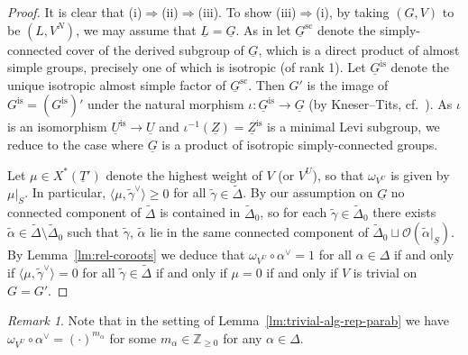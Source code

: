 \documentclass[a4paper]{amsart}
\numberwithin{equation}{section}
\theoremstyle{remark}
\newtheorem{remark}[thm]{Remark}
\theoremstyle{definition}
\newcommand{\Z}{\mathbb{Z}}
\newcommand{\alggrp}[1]{\underline{#1}}
\newcommand{\is}{\mathrm{is}}
\renewcommand{\sc}{\mathrm{sc}}
\newcommand{\ang}[1]{\langle #1\rangle}
\newcommand{\wt}[1]{\widetilde{#1}}
\begin{document}
\begin{proof}
  It is clear that (i)$\Rightarrow$(ii)$\Rightarrow$(iii).
  To show (iii)$\Rightarrow$(i), by taking $(G,V)$ to be $(L,V^{N})$, we may assume that $\alggrp L = \alggrp G$.
  As in \cite[II.4]{AHHV} let $\alggrp{G}^\sc$ denote the simply-connected cover of the derived subgroup of $\alggrp{G}$, which is a direct product of almost simple groups, precisely one of which is isotropic (of rank 1).
  Let $\alggrp{G}^\is$ denote the unique isotropic almost simple factor of $\alggrp{G}^\sc$.
  Then $G'$ is the image of $G^\is = (G^\is)'$ under the natural morphism $\iota\colon \alggrp{G}^\is\to \alggrp{G}$ (by Kneser--Tits, cf.\ \cite[II.4]{AHHV}).
  As $\iota$ is an isomorphism $\alggrp{U}^\is \to \alggrp{U}$ and $\iota^{-1}(\alggrp{Z}) = \alggrp{Z}^\is$ is a minimal Levi subgroup, we reduce to the case where $\alggrp{G}$ is a product of isotropic simply-connected groups.

  Let $\mu \in X^*(\alggrp{T}')$ denote the highest weight of $V$ (or $V^U$), so that $\omega_{V^U}$ is given by $\mu|_S$.
  In particular, $\ang{\mu,\widetilde{\gamma}^{\vee}} \ge 0$ for all $\widetilde{\gamma} \in \widetilde{\Delta}$.
  By our assumption on $\alggrp{G}$ no connected component of $\widetilde{\Delta}$ is contained in $\widetilde{\Delta}_0$, so for each $\widetilde\gamma \in \widetilde{\Delta}_0$ there exists $\widetilde\alpha \in \wt\Delta\setminus \wt\Delta_0$ such that $\wt\gamma$, $\wt\alpha$ lie in the same connected component of $\wt\Delta_0 \sqcup \mathcal O(\wt\alpha|_{\alggrp S})$.
  By Lemma~\ref{lm:rel-coroots} we deduce that $\omega_{V^U} \circ \alpha^{\vee} = 1$ for all $\alpha \in \Delta$ if and only if $\ang{\mu,\widetilde{\gamma}^{\vee}} = 0$ for all $\widetilde{\gamma} \in \widetilde{\Delta}$
  if and only if $\mu = 0$ if and only if $V$ is trivial on $G = G'$.
\end{proof}

\begin{remark}\label{rk:dominant-parab}
  Note that in the setting of Lemma~\ref{lm:trivial-alg-rep-parab} we have $\omega_{V^U} \circ \alpha^{\vee} = (\cdot)^{m_\alpha}$ for some $m_\alpha \in \Z_{\ge 0}$
  for any $\alpha \in \Delta$.
\end{remark}
\end{document}
